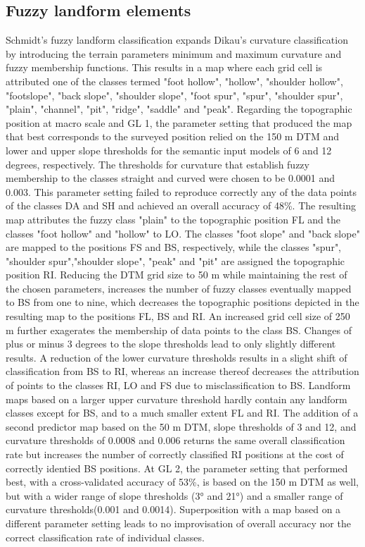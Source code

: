 \documentclass[preprint,12pt,authoryear]{elsarticle}
\begin{document}
\subsection{Fuzzy landform elements}
Schmidt's fuzzy landform classification expands Dikau's curvature classification by introducing the terrain parameters minimum and maximum curvature and fuzzy membership functions. This results in a map where each grid cell is attributed one of the classes termed "foot hollow", "hollow", "shoulder hollow", "footslope", "back slope", "shoulder slope", "foot spur", "spur", "shoulder spur", "plain", "channel", "pit", "ridge", "saddle" and "peak".
Regarding the topographic position at macro scale and GL 1, the parameter setting that produced the map that best corresponds to the surveyed position relied on the 150 m DTM and lower and upper slope thresholds for the semantic input models of 6 and 12 degrees, respectively. The thresholds for curvature that establish fuzzy membership to the classes straight and curved were chosen to be 0.0001 and 0.003. This parameter setting failed to reproduce correctly any of the data points of the classes DA and SH and achieved an overall accuracy of 48\%. The resulting map attributes the fuzzy class "plain" to the topographic position FL and the classes "foot hollow" and "hollow" to LO. The classes "foot slope" and "back slope" are mapped to the positions FS and BS, respectively, while the classes "spur", "shoulder spur","shoulder slope", "peak" and "pit" are assigned the topographic position RI. Reducing the DTM grid size to 50 m while maintaining the rest of the chosen parameters, increases the number of fuzzy classes eventually mapped to BS from one to nine, which decreases the topographic positions depicted in the resulting map to the positions FL, BS and RI. An increased grid cell size of 250 m further exagerates the membership of data points to the class BS. Changes of plus or minus 3 degrees to the slope thresholds lead to only slightly different results. A reduction of the lower curvature thresholds results in a slight shift of classification from BS to RI, whereas an increase thereof decreases the attribution of points to the classes RI, LO and FS due to misclassification to BS. Landform maps based on a larger upper curvature threshold hardly contain any landform classes except for BS, and to a much smaller extent FL and RI. The addition of a second predictor map based on the 50 m DTM, slope thresholds of 3 and 12, and curvature thresholds of 0.0008 and 0.006 returns the same overall classification rate but increases the number of correctly classified RI positions at the cost of correctly identied BS positions. At GL 2, the parameter setting that performed best, with a cross-validated accuracy of 53\%, is based on the 150 m DTM as well, but with a wider range of slope thresholds (3° and 21°) and a smaller range of curvature thresholds(0.001 and 0.0014). Superposition with a map based on a different parameter setting leads to no improvisation of overall accuracy nor the correct classification rate of individual classes.
\end{document}
